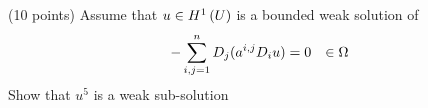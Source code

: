 (10 points)
Assume that $u \in H^{1}\left(U \right)$ is a bounded weak solution of
\begin{align*}
  -\sum_{i, j = 1}^n D_{j} (a^{i, j} D_{i} u) = 0 & & \in \Omega
\end{align*}
Show that $u^5$ is a weak sub-solution
